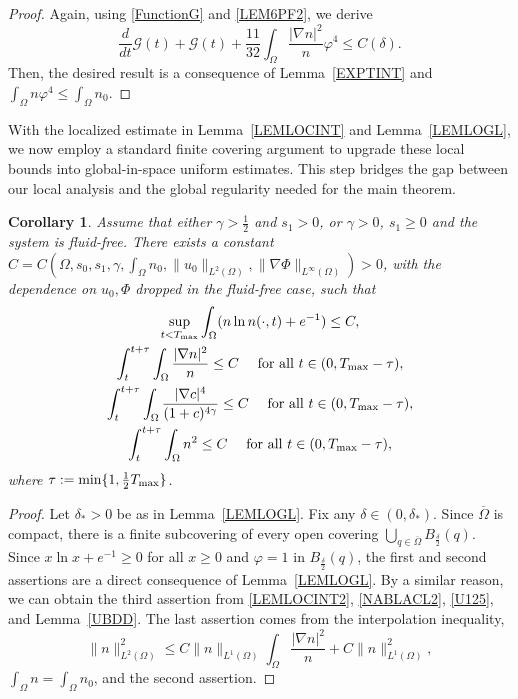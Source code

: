 \documentclass{amsart}
\newtheorem{cor}[defn]{Corollary}
\numberwithin{equation}{section}
\begin{document}
\begin{proof}
Again, using \eqref{FunctionG} and \eqref{LEM6PF2}, we derive 
\[
\frac{d}{dt}\mathcal{G}(t)+\mathcal{G}(t) +\frac{11}{32}\int_{\Omega} \frac{|\nabla n|^{2}}{n}\varphi^{4}\le C(\delta).
\]
Then, the desired result is a consequence of Lemma~\ref{EXPTINT} and
$
\int_{\Omega}n\varphi^{4}\le\int_{\Omega}n_{0}$. 
\end{proof}




With the localized estimate in Lemma~\ref{LEMLOCINT} and Lemma~\ref{LEMLOGL}, we now employ a standard finite covering argument to upgrade these local bounds into global-in-space uniform estimates. This step bridges the gap between our local analysis and the global regularity needed for the main theorem.


\begin{cor}\label{COR1}
Assume that either $\gamma>\frac12$ and $s_1>0$, or $\gamma>0$, $s_1\ge0$ and the system is fluid-free.
There exists a constant $C=C (\Omega,s_0,s_1,\gamma,\textstyle\int_\Omega n_0,\|u_0\|_{L^2(\Omega)},\|\nabla\Phi\|_{L^\infty(\Omega)})>0$, with the dependence on $u_0,\Phi$ dropped in the fluid-free case, such that
\[\begin{gathered}
\sup_{t<T_{\rm max}} \int_{\Omega}   (n\ln n (\cdot,t)+e^{-1}) \le C, \\	
\int_{t}^{t+\tau}\int_{\Omega}\frac{|\nabla n|^{2}}{n}  \le C  \quad\mbox{ for all }t\in(0,T_{\rm max}-\tau), \\
\int_{t}^{t+\tau}\int_{\Omega}  \frac{|\nabla c|^{4}}{(1+c)^{4\gamma }}  \le C 
\quad\mbox{ for all }t\in(0,T_{\rm max}-\tau), \\
\int_{t}^{t+\tau}\int_{\Omega}   n^{2} \le C \quad\mbox{ for all }t\in(0,T_{\rm max}-\tau),
\end{gathered}
\]
where $\tau:=\min\{1,\frac{1}{2}T_{\rm max}\}$.
\end{cor}

\begin{proof}
Let $\delta_*>0$ be as in Lemma~\ref{LEMLOGL}. Fix any $\delta\in(0,\delta_*)$.
Since $\overline{\Omega}$ is compact, there is a finite subcovering of every open covering $ \bigcup_{q\in\overline{\Omega}}B_{\frac{\delta}{2}}(q)$. 
Since $x\ln x+e^{-1}\ge0$ for all $x\ge0$ and $\varphi=1$ in $B_{\frac{\delta}{2}}(q)$, the first and second assertions are a direct consequence of Lemma~\ref{LEMLOGL}. 
 By a similar reason, 
we can obtain the third assertion from \eqref{LEMLOCINT2}, \eqref{NABLACL2}, \eqref{U125}, and Lemma~\ref{UBDD}.
The last assertion comes from   the  interpolation inequality,
\[
\|n\|_{L^{2}(\Omega)}^{2}\le C\|n\|_{L^{1}(\Omega)}\int_{\Omega}\frac{|\nabla n|^{2}}{n}+C \|n\|_{L^{1}(\Omega)}^{2},
\]
$\int_{\Omega}n=\int_{\Omega}n_{0}$, and the second assertion.
\end{proof}
\end{document}
